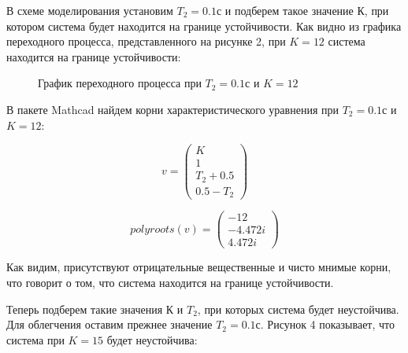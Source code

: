 \documentclass[a4paper, 11pt]{article}
\begin{document}
\par 
	В схеме моделирования установим  $T_2=0.1 с$ и подберем такое значение $К$, при котором система будет находится на границе устойчивости. Как видно из графика переходного процесса, представленного на рисунке 2, при $K = 12$ система находится на границе устойчивости:

\newpage
\begin{figure}[h!]
\caption{График переходного процесса при $T_2=0.1 с$ и $K=12$}
\label{ris:image}
\end{figure}

\par 
	В пакете Mathcad найдем корни характеристического уравнения при $T_2=0.1 с$ и $K=12$:

\begin{equation}
v=\left(
\begin{matrix}

K \\
1 \\
T_2+0.5 \\
0.5-T_2 

\end{matrix}
\right)	
\end{equation}

\begin{equation}
polyroots(v)=\left(
\begin{matrix}
-12 \\
-4.472i \\
4.472i
\end{matrix}
\right)
\end{equation}

\par 	
Как видим, присутствуют отрицательные вещественные и чисто мнимые корни, что говорит о том, что система находится на границе устойчивости.
\par 
Теперь подберем такие значения $К$ и $T_2$, при которых система будет неустойчива. Для облегчения оставим прежнее значение $T_2=0.1 с$. Рисунок 4 показывает, что система при $K = 15$ будет неустойчива:
\end{document}
